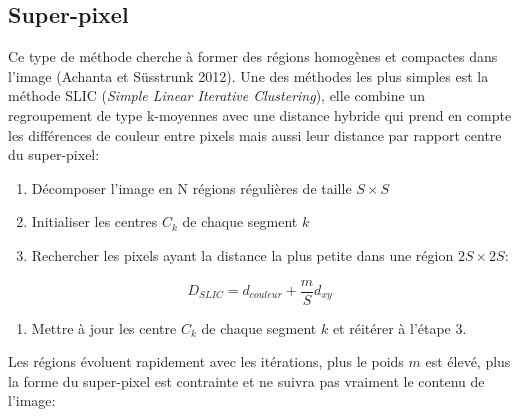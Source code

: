 \documentclass[
  11pt,
  letterpaper,
  open=any,
  twoside=false,
  french]{scrbook}
\providecommand{\tightlist}{%
  \setlength{\itemsep}{0pt}\setlength{\parskip}{0pt}}\usepackage{longtable,booktabs,array}
\begin{document}
\subsection{Super-pixel}\label{super-pixel}

Ce type de méthode cherche à former des régions homogènes et compactes
dans l'image (Achanta et Süsstrunk 2012). Une des méthodes les plus
simples est la méthode SLIC (\emph{Simple Linear Iterative Clustering}),
elle combine un regroupement de type k-moyennes avec une distance
hybride qui prend en compte les différences de couleur entre pixels mais
aussi leur distance par rapport centre du super-pixel:

\begin{enumerate}
\def\labelenumi{\arabic{enumi}.}
\item
  Décomposer l'image en N régions régulières de taille \(S \times S\)
\item
  Initialiser les centres \(C_k\) de chaque segment \(k\)
\item
  Rechercher les pixels ayant la distance la plus petite dans une région
  \(2S \times 2S\):
\end{enumerate}

\[
D_{SLIC}= d_{couleur} + \frac{m}{S}d_{xy}
\]

\begin{enumerate}
\def\labelenumi{\arabic{enumi}.}
\setcounter{enumi}{3}
\tightlist
\item
  Mettre à jour les centre \(C_k\) de chaque segment \(k\) et réitérer à
  l'étape 3.
\end{enumerate}

Les régions évoluent rapidement avec les itérations, plus le poids \(m\)
est élevé, plus la forme du super-pixel est contrainte et ne suivra pas
vraiment le contenu de l'image:
\end{document}
